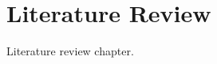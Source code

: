 \chapter{Literature Review}
\label{ch:literaturereview} 

Literature review chapter. 

\newpage
\adjustmtc
\minitoc %
\newpage



